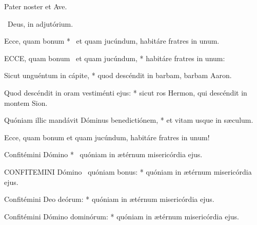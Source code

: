 

Pater noster et Ave.

\V\ Deus, in adjutórium.

 Ecce, quam bonum * \textdagger\ et quam jucúndum, habitáre fratres in unum. \textdaggerdbl


\lettrine[lines=2]{E}{CCE}, quam bonum \textdagger\ et quam jucúndum, * habitáre fratres in unum: \textdaggerdbl

Sicut unguéntum in cápite, * quod descéndit in barbam, barbam Aaron.

Quod descéndit in oram vestiménti ejus: * sicut ros Hermon, qui descéndit in montem Sion.

Quóniam illic mandávit Dóminus benedictiónem, * et vitam usque in sæculum.

 Ecce, quam bonum et quam jucúndum, habitáre fratres in unum!

 Confitémini Dómino * \textdagger\ quóniam in ætérnum misericórdia ejus.


\lettrine[lines=2]{C}{ONFITEMINI} Dómino \textdagger\ quóniam bonus: * quóniam in ætérnum misericórdia ejus.

Confitémini Deo deórum: * quóniam in ætérnum misericórdia ejus.

Confitémini Dómino dominórum: * quóniam in ætérnum misericórdia ejus.

